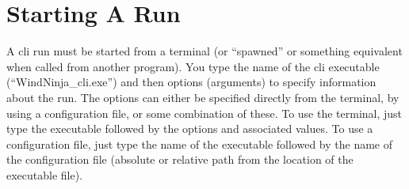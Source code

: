 \documentclass[12pt]{article}
\begin{document}

\section*{Starting A Run}
A cli run must be started from a terminal (or “spawned” or something equivalent when called from another program).  You type the name of the cli executable (“WindNinja\_cli.exe”) and then options (arguments) to specify information about the run.  The options can either be specified directly from the terminal, by using a configuration file, or some combination of these.  To use the terminal, just type the executable followed by the options and associated values.  To use a configuration file, just type the name of the executable followed by the name of the configuration file (absolute or relative path from the location of the executable file).  %
\end{document}
